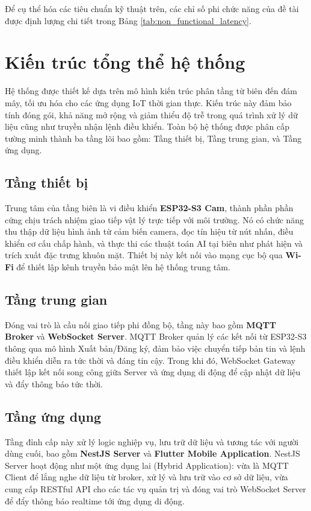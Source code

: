 Để cụ thể hóa các tiêu chuẩn kỹ thuật trên, các chỉ số phi chức năng của đề tài được định lượng chi tiết trong Bảng \ref{tab:non_functional_latency}.



\section{Kiến trúc tổng thể hệ thống}
\label{sec:architecture}

Hệ thống được thiết kế dựa trên mô hình kiến trúc phân tầng từ biên đến đám mây, tối ưu hóa cho các ứng dụng IoT thời gian thực. Kiến trúc này đảm bảo tính đóng gói, khả năng mở rộng và giảm thiểu độ trễ trong quá trình xử lý dữ liệu cũng như truyền nhận lệnh điều khiển. Toàn bộ hệ thống được phân cấp tường minh thành ba tầng lõi bao gồm: Tầng thiết bị, Tầng trung gian, và Tầng ứng dụng.

\subsection{Tầng thiết bị}
Trung tâm của tầng biên là vi điều khiển \textbf{ESP32-S3 Cam}, thành phần phần cứng chịu trách nhiệm giao tiếp vật lý trực tiếp với môi trường. Nó có chức năng thu thập dữ liệu hình ảnh từ cảm biến camera, đọc tín hiệu từ nút nhấn, điều khiển cơ cấu chấp hành, và thực thi các thuật toán AI tại biên như phát hiện và trích xuất đặc trưng khuôn mặt. Thiết bị này kết nối vào mạng cục bộ qua \textbf{Wi-Fi} để thiết lập kênh truyền bảo mật lên hệ thống trung tâm.

\subsection{Tầng trung gian}
Đóng vai trò là cầu nối giao tiếp phi đồng bộ, tầng này bao gồm \textbf{MQTT Broker} và \textbf{WebSocket Server}. MQTT Broker quản lý các kết nối từ ESP32-S3 thông qua mô hình Xuất bản/Đăng ký, đảm bảo việc chuyển tiếp bản tin và lệnh điều khiển diễn ra tức thời và đáng tin cậy. Trong khi đó, WebSocket Gateway thiết lập kết nối song công giữa Server và ứng dụng di động để cập nhật dữ liệu và đẩy thông báo tức thời.

\subsection{Tầng ứng dụng}
Tầng đỉnh cấp này xử lý logic nghiệp vụ, lưu trữ dữ liệu và tương tác với người dùng cuối, bao gồm \textbf{NestJS Server} và \textbf{Flutter Mobile Application}. NestJS Server hoạt động như một ứng dụng lai (Hybrid Application): vừa là MQTT Client để lắng nghe dữ liệu từ broker, xử lý và lưu trữ vào cơ sở dữ liệu, vừa cung cấp RESTful API cho các tác vụ quản trị và đóng vai trò WebSocket Server để đẩy thông báo realtime tới ứng dụng di động.

